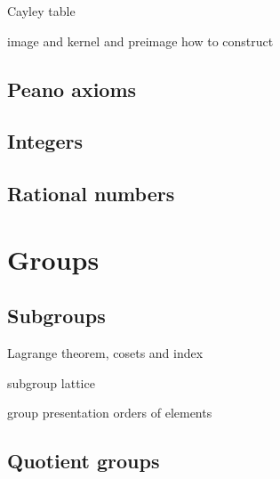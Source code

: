\documentclass{../../large}
\begin{document}
Cayley table


\begin{prb}[Homomorphisms]
image and kernel and preimage
how to construct
\end{prb}


\section{Peano axioms}

\section{Integers}

\section{Rational numbers}






\chapter{Groups}

\section{Subgroups}

\begin{prb}[Subgroups]
Lagrange theorem, cosets and index

subgroup lattice
\end{prb}

\begin{prb}[Generators]
group presentation
orders of elements
\end{prb}




\section{Quotient groups}
\begin{prb}
\end{prb}

\begin{prb}
\end{prb}

\begin{prb}
\end{prb}
\end{document}
